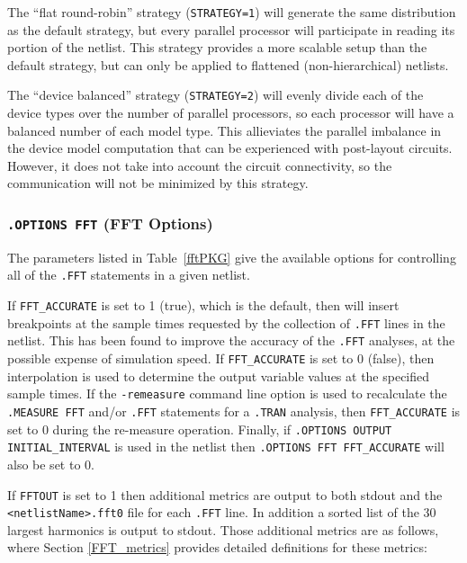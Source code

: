 {{The ``flat round-robin'' strategy (\texttt{STRATEGY=1}) will generate
the same distribution as the default strategy, but every parallel
processor will participate in reading its portion of the netlist.
This strategy provides a more scalable setup than the default
strategy, but can only be applied to flattened (non-hierarchical)
netlists.

The ``device balanced'' strategy (\texttt{STRATEGY=2}) will evenly
divide each of the device types over the number of parallel
processors, so each processor will have a balanced number of each
model type.  This allieviates the parallel imbalance in the device
model computation that can be experienced with post-layout circuits.
However, it does not take into account the circuit connectivity, so
the communication will not be minimized by this strategy.



\subsubsection{\texttt{.OPTIONS FFT} (FFT Options)}
The parameters listed in Table~\ref{fftPKG} give the available
options for controlling all of the \texttt{.FFT} statements in
a given \Xyce{} netlist.

If \texttt{FFT\_ACCURATE} is set to 1 (true), which is the default, then
\Xyce{} will insert breakpoints at the sample times requested by the
collection of \texttt{.FFT} lines in the netlist.  This has been found
to improve the accuracy of the \texttt{.FFT} analyses, at the possible
expense of simulation speed.  If \texttt{FFT\_ACCURATE} is set to
0 (false), then interpolation is used to determine the output variable
values at the specified sample times.  If the \texttt{-remeasure} command
line option is used to recalculate the \texttt{.MEASURE FFT} and/or
\texttt{.FFT} statements for a \texttt{.TRAN} analysis, then
\texttt{FFT\_ACCURATE} is set to 0 during the re-measure operation.  Finally,
if \texttt{.OPTIONS OUTPUT INITIAL\_INTERVAL} is used in the netlist
then \texttt{.OPTIONS FFT FFT\_ACCURATE} will also be set to 0.

If \texttt{FFTOUT} is set to 1 then additional metrics are output to both stdout
and the \verb+<netlistName>.fft0+ file for each \texttt{.FFT} line.  In
addition a sorted list of the 30 largest harmonics is output to stdout.
Those additional metrics are as follows, where Section \ref{FFT_metrics}
provides detailed definitions for these metrics:

}}
